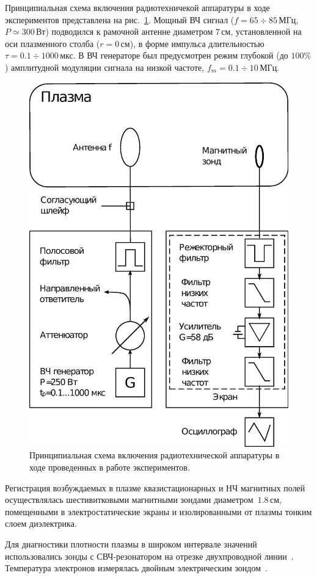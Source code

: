 \documentclass[autoref,10pt]{disser}
\begin{document}
Принципиальная схема включения радиотехничекой аппаратуры в ходе  экспериментов представлена на \mbox{рис.~\ref{fig:scheme_setup}}. Мощный ВЧ сигнал ($f=65\div{}85$\,МГц, $P\simeq300$\,Вт) подводился к рамочной антенне диаметром $7$\,см, установленной на оси плазменного столба ($r=0$\,см), в форме импульса длительностью $\tau=0.1\div1000$\,мкс. В ВЧ генераторе был предусмотрен режим глубокой (до $100\%$) амплитудной модуляции сигнала на низкой частоте, $f_m=0.1\div{}10$\,МГц. 
\begin{figure}[H]
    \centering
    \includegraphics*[width=0.7\columnwidth]{pics/scheme_setup.eps}
    \caption{Принципиальная схема включения радиотехнической аппаратуры в ходе проведенных в работе экспериментов.}
    \label{fig:scheme_setup}
 \end{figure}

Регистрация возбуждаемых в плазме квазистационарных и НЧ магнитных полей осуществлялась шестивитковыми магнитными зондами диаметром~$1.8$\,см, помещенными в электростатические экраны и изолированными от плазмы тонким слоем диэлектрика. 

Для диагностики плотности плазмы в широком интервале значений использовались зонды с СВЧ-резонатором на отрезке двухпроводной линии~\cite{Stenzel,Yanin}. Температура электронов измерялась двойным электрическим зондом~\cite{UHF_probe}. 
\end{document}
